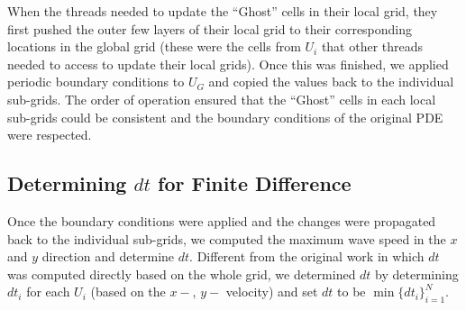 \documentclass{article}
\begin{document}
When the threads needed to update the ``Ghost'' cells in their local grid, they first pushed the outer few layers of their local grid to their corresponding locations in the global grid 
(these were the cells from $U_i$ that other threads needed to access to update their local grids). Once this was finished, we applied periodic boundary conditions to $U_G$ and copied the values back 
to the individual sub-grids. The order of operation ensured that the ``Ghost'' cells in each local sub-grids could be consistent and the boundary conditions of the original PDE were respected. 

\subsection{Determining $dt$ for Finite Difference}
Once the boundary conditions were applied and the changes were propagated back to the individual sub-grids, 
we computed the maximum wave speed in the $x$ and $y$ direction and determine $dt$. 
Different from the original work in which $dt$ was computed directly based on the whole grid, 
we determined $dt$ by determining $dt_i$ for each $U_i$ (based on the $x-$, $y-$ velocity) and set 
$dt$ to be $\min\{dt_i\}_{i=1}^N$. 






  
\end{document}
